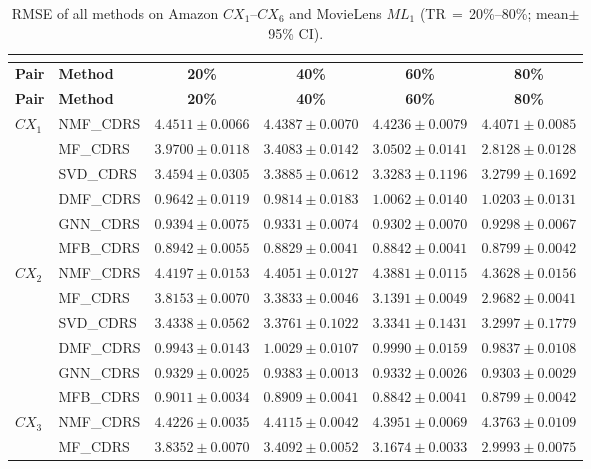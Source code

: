 \documentclass[pdflatex,sn-mathphys-num]{sn-jnl}%
\theoremstyle{thmstyleone}%
\theoremstyle{thmstyletwo}%
\theoremstyle{thmstylethree}%
\begin{document}
\begin{longtable}{llcccc}
\caption{RMSE of all methods on Amazon $CX_1$--$CX_6$ and MovieLens $ML_1$ (TR\,$=$\,20\%--80\%; mean$\pm$95\% CI).}\\
\label{tab:rmse_all_results}\\
\toprule
\textbf{Pair} & \textbf{Method} & \textbf{20\%} & \textbf{40\%} & \textbf{60\%} & \textbf{80\%} \\
\midrule
\endfirsthead
\toprule
\textbf{Pair} & \textbf{Method} & \textbf{20\%} & \textbf{40\%} & \textbf{60\%} & \textbf{80\%} \\
\midrule
\endhead
\bottomrule
\endfoot
\bottomrule
\endlastfoot
$CX_1$ & NMF\_CDRS & $4.4511\pm0.0066$ & $4.4387\pm0.0070$ & $4.4236\pm0.0079$ & $4.4071\pm0.0085$ \\
 & MF\_CDRS & $3.9700\pm0.0118$ & $3.4083\pm0.0142$ & $3.0502\pm0.0141$ & $2.8128\pm0.0128$ \\
 & SVD\_CDRS & $3.4594\pm0.0305$ & $3.3885\pm0.0612$ & $3.3283\pm0.1196$ & $3.2799\pm0.1692$ \\
 & DMF\_CDRS & $0.9642\pm0.0119$ & $0.9814\pm0.0183$ & $1.0062\pm0.0140$ & $1.0203\pm0.0131$ \\
 & GNN\_CDRS & $0.9394\pm0.0075$ & $0.9331\pm0.0074$ & $0.9302\pm0.0070$ & $0.9298\pm0.0067$ \\
 & MFB\_CDRS & $0.8942\pm0.0055$ & $0.8829\pm0.0041$ & $0.8842\pm0.0041$ & $0.8799\pm0.0042$ \\
\midrule
$CX_2$ & NMF\_CDRS & $4.4197\pm0.0153$ & $4.4051\pm0.0127$ & $4.3881\pm0.0115$ & $4.3628\pm0.0156$ \\
 & MF\_CDRS & $3.8153\pm0.0070$ & $3.3833\pm0.0046$ & $3.1391\pm0.0049$ & $2.9682\pm0.0041$ \\
 & SVD\_CDRS & $3.4338\pm0.0562$ & $3.3761\pm0.1022$ & $3.3341\pm0.1431$ & $3.2997\pm0.1779$ \\
 & DMF\_CDRS & $0.9943\pm0.0143$ & $1.0029\pm0.0107$ & $0.9990\pm0.0159$ & $0.9837\pm0.0108$ \\
 & GNN\_CDRS & $0.9329\pm0.0025$ & $0.9383\pm0.0013$ & $0.9332\pm0.0026$ & $0.9303\pm0.0029$ \\
 & MFB\_CDRS & $0.9011\pm0.0034$ & $0.8909\pm0.0041$ & $0.8842\pm0.0041$ & $0.8799\pm0.0042$ \\
\midrule
$CX_3$ & NMF\_CDRS & $4.4226\pm0.0035$ & $4.4115\pm0.0042$ & $4.3951\pm0.0069$ & $4.3763\pm0.0109$ \\
 & MF\_CDRS & $3.8352\pm0.0070$ & $3.4092\pm0.0052$ & $3.1674\pm0.0033$ & $2.9993\pm0.0075$ \\

\end{longtable}
\end{document}
